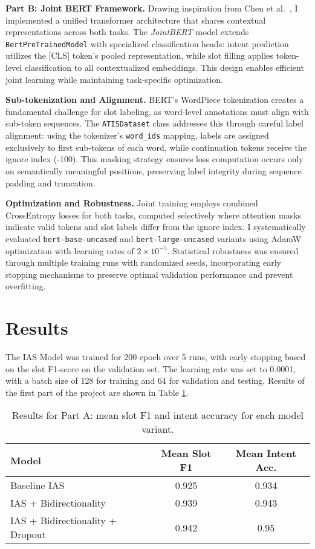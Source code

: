 \documentclass[a4paper]{article}
\begin{document}
\textbf{Part B: Joint BERT Framework.} Drawing inspiration from Chen et al.~\cite{chen2019bertjointintentclassification}, I implemented a unified transformer architecture that shares contextual representations across both tasks. The \textit{JointBERT} model extends \texttt{BertPreTrainedModel} with specialized classification heads: intent prediction utilizes the [CLS] token's pooled representation, while slot filling applies token-level classification to all contextualized embeddings. This design enables efficient joint learning while maintaining task-specific optimization.

\textbf{Sub-tokenization and Alignment.} BERT's WordPiece tokenization creates a fundamental challenge for slot labeling, as word-level annotations must align with sub-token sequences. The \texttt{ATISDataset} class addresses this through careful label alignment: using the tokenizer's \texttt{word\_ids} mapping, labels are assigned exclusively to first sub-tokens of each word, while continuation tokens receive the ignore index (-100). This masking strategy ensures loss computation occurs only on semantically meaningful positions, preserving label integrity during sequence padding and truncation.

\textbf{Optimization and Robustness.} Joint training employs combined CrossEntropy losses for both tasks, computed selectively where attention masks indicate valid tokens and slot labels differ from the ignore index. I systematically evaluated \texttt{bert-base-uncased} and \texttt{bert-large-uncased} variants using AdamW optimization with learning rates of $2 \times 10^{-5}$. Statistical robustness was ensured through multiple training runs with randomized seeds, incorporating early stopping mechanisms to preserve optimal validation performance and prevent overfitting.
\section{Results}
The IAS Model was trained for 200 epoch over 5 runs, with early stopping based on the slot F1-score on the validation set.
The learning rate was set to 0.0001, with a batch size of 128 for training and 64 for validation and testing. 
Results of the first part of the project are shown in Table \ref{tab:partAresults}.
\begin{table}[h!]
  \centering
  \begin{tabular}{lcc}
    \toprule
    \textbf{Model} & \textbf{Mean Slot F1} & \textbf{Mean Intent Acc.} \\
    \midrule
    Baseline IAS & 0.925 & 0.934 \\
    IAS + Bidirectionality & 0.939 & 0.943 \\
    IAS + Bidirectionality + Dropout & 0.942 & 0.95 \\ 
    \bottomrule
  \end{tabular}
  \caption{Results for Part A: mean slot F1 and intent accuracy for each model variant.}
  \label{tab:partAresults}
\end{table}
\end{document}
